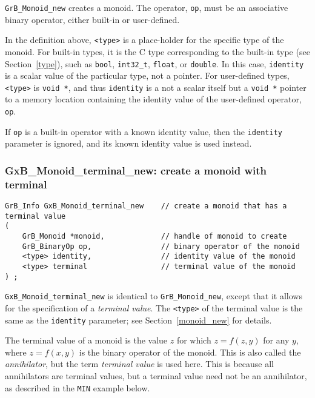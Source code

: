 \documentclass[12pt]{article}
\begin{document}
\verb'GrB_Monoid_new' creates a monoid.  The operator, \verb'op', must be an
associative binary operator, either built-in or user-defined.

In the definition above, \verb'<type>' is a place-holder for the specific type
of the monoid.  For built-in types, it is the C type corresponding to the
built-in type (see Section~\ref{type}), such as \verb'bool', \verb'int32_t',
\verb'float', or \verb'double'.  In this case, \verb'identity' is a
scalar value of the particular type, not a pointer.  For
user-defined types, \verb'<type>' is \verb'void *', and thus \verb'identity' is
a not a scalar itself but a \verb'void *' pointer to a memory location
containing the identity value of the user-defined operator, \verb'op'.

If \verb'op' is a built-in operator with a known identity value, then the
\verb'identity' parameter is ignored, and its known identity value is used
instead.

\subsubsection{{\sf GxB\_Monoid\_terminal\_new:} create a monoid with terminal}
\label{monoid_terminal_new}

\begin{mdframed}[userdefinedwidth=6in]
{\footnotesize
\begin{verbatim}
GrB_Info GxB_Monoid_terminal_new    // create a monoid that has a terminal value
(
    GrB_Monoid *monoid,             // handle of monoid to create
    GrB_BinaryOp op,                // binary operator of the monoid
    <type> identity,                // identity value of the monoid
    <type> terminal                 // terminal value of the monoid
) ;
\end{verbatim}
} \end{mdframed}

\verb'GxB_Monoid_terminal_new' is identical to \verb'GrB_Monoid_new', except
that it allows for the specification of a {\em terminal value}.  The
\verb'<type>' of the terminal value is the same as the \verb'identity'
parameter; see Section~\ref{monoid_new} for details.

The terminal value of a monoid is the value $z$ for which $z=f(z,y)$ for any
$y$, where $z=f(x,y)$ is the binary operator of the monoid.  This is also
called the {\em annihilator}, but the term {\em terminal value} is used here.
This is because all annihilators are terminal values, but a terminal value need
not be an annihilator, as described in the \verb'MIN' example below.
\end{document}
